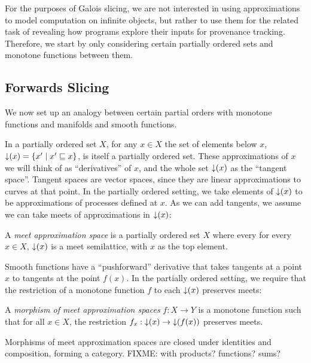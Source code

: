 For the purposes of Galois slicing, we are not interested in using
approximations to model computation on infinite objects, but rather to
use them for the related task of revealing how programs explore their
inputs for provenance tracking. Therefore, we start by only
considering certain partially ordered sets and monotone functions
between them.

\subsection{Forwards Slicing}

We now set up an analogy between certain partial orders with monotone
functions and manifolds and smooth functions.

In a partially ordered set $X$, for any $x \in X$ the set of elements
below $x$, $\mathop{\downarrow}(x) = \{ x' \mid x' \sqsubseteq x \}$, is itself a
partially ordered set. These approximations of $x$ we will think of as
``derivatives'' of $x$, and the whole set $\mathop{\downarrow}(x)$ as the
``tangent space''. Tangent spaces are vector spaces, since they are
linear approximations to curves at that point. In the partially
ordered setting, we take elements of $\mathop{\downarrow}(x)$ to be
approximations of processes defined at $x$. As we can add tangents, we
assume we can take meets of approximations in $\mathop{\downarrow}(x)$:

\begin{definition}
  A \emph{meet approximation space} is a partially ordered set $X$
  where every for every $x \in X$, $\mathop{\downarrow}(x)$ is a meet
  semilattice, with $x$ as the top element.
\end{definition}

Smooth functions have a ``pushforward'' derivative that takes tangents
at a point $x$ to tangents at the point $f(x)$. In the partially
ordered setting, we require that the restriction of a monotone
function $f$ to each $\mathop{\downarrow}(x)$ preserves meets:

\begin{definition}
  A \emph{morphism of meet approximation spaces} $f : X \to Y$ is a
  monotone function such that for all $x \in X$, the restriction
  $f_x : \mathop{\downarrow}(x) \to \mathop{\downarrow}(f(x))$ preserves meets.
\end{definition}

\begin{lemma}
  Morphisms of meet approximation spaces are closed under identities
  and composition, forming a category. FIXME: with products?
  functions? sums?
\end{lemma}

